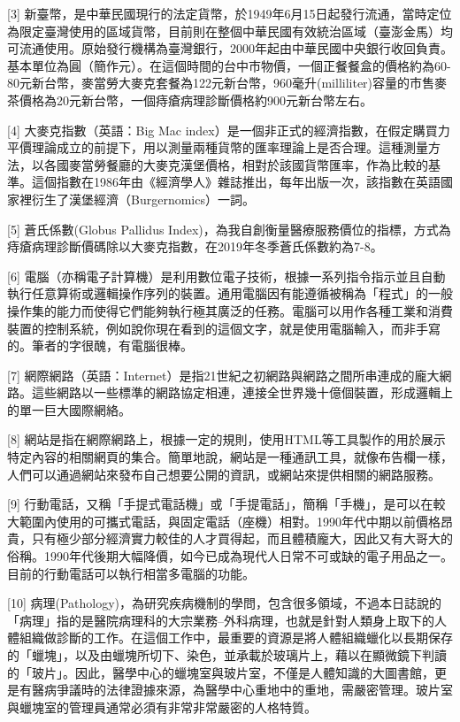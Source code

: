 \documentclass[a5paper, 12pt
]{book}
\begin{document}
{[}3{]}
新臺幣，是中華民國現行的法定貨幣，於1949年6月15日起發行流通，當時定位為限定臺灣使用的區域貨幣，目前則在整個中華民國有效統治區域（臺澎金馬）均可流通使用。原始發行機構為臺灣銀行，2000年起由中華民國中央銀行收回負責。基本單位為圓（簡作元）。在這個時間的台中市物價，一個正餐餐盒的價格約為60-80元新台幣，麥當勞大麥克套餐為122元新台幣，960毫升(milliliter)容量的市售麥茶價格為20元新台幣，一個痔瘡病理診斷價格約900元新台幣左右。

{[}4{]} 大麥克指數（英語：Big Mac
index）是一個非正式的經濟指數，在假定購買力平價理論成立的前提下，用以測量兩種貨幣的匯率理論上是否合理。這種測量方法，以各國麥當勞餐廳的大麥克漢堡價格，相對於該國貨幣匯率，作為比較的基準。這個指數在1986年由《經濟學人》雜誌推出，每年出版一次，該指數在英語國家裡衍生了漢堡經濟（Burgernomics）一詞。

{[}5{]} 蒼氏係數(Globus Pallidus
Index)，為我自創衡量醫療服務價位的指標，方式為痔瘡病理診斷價碼除以大麥克指數，在2019年冬季蒼氏係數約為7-8。

{[}6{]}
電腦（亦稱電子計算機）是利用數位電子技術，根據一系列指令指示並且自動執行任意算術或邏輯操作序列的裝置。通用電腦因有能遵循被稱為「程式」的一般操作集的能力而使得它們能夠執行極其廣泛的任務。電腦可以用作各種工業和消費裝置的控制系統，例如說你現在看到的這個文字，就是使用電腦輸入，而非手寫的。筆者的字很醜，有電腦很棒。

{[}7{]}
網際網路（英語：Internet）是指21世紀之初網路與網路之間所串連成的龐大網路。這些網路以一些標準的網路協定相連，連接全世界幾十億個裝置，形成邏輯上的單一巨大國際網絡。

{[}8{]}
網站是指在網際網路上，根據一定的規則，使用HTML等工具製作的用於展示特定內容的相關網頁的集合。簡單地說，網站是一種通訊工具，就像布告欄一樣，人們可以通過網站來發布自己想要公開的資訊，或網站來提供相關的網路服務。

{[}9{]}
行動電話，又稱「手提式電話機」或「手提電話」，簡稱「手機」，是可以在較大範圍內使用的可攜式電話，與固定電話（座機）相對。1990年代中期以前價格昂貴，只有極少部分經濟實力較佳的人才買得起，而且體積龐大，因此又有大哥大的俗稱。1990年代後期大幅降價，如今已成為現代人日常不可或缺的電子用品之一。目前的行動電話可以執行相當多電腦的功能。

{[}10{]}
病理(Pathology)，為研究疾病機制的學問，包含很多領域，不過本日誌說的「病理」指的是醫院病理科的大宗業務--外科病理，也就是針對人類身上取下的人體組織做診斷的工作。在這個工作中，最重要的資源是將人體組織蠟化以長期保存的「蠟塊」，以及由蠟塊所切下、染色，並承載於玻璃片上，藉以在顯微鏡下判讀的「玻片」。因此，醫學中心的蠟塊室與玻片室，不僅是人體知識的大圖書館，更是有醫病爭議時的法律證據來源，為醫學中心重地中的重地，需嚴密管理。玻片室與蠟塊室的管理員通常必須有非常非常嚴密的人格特質。
\end{document}

